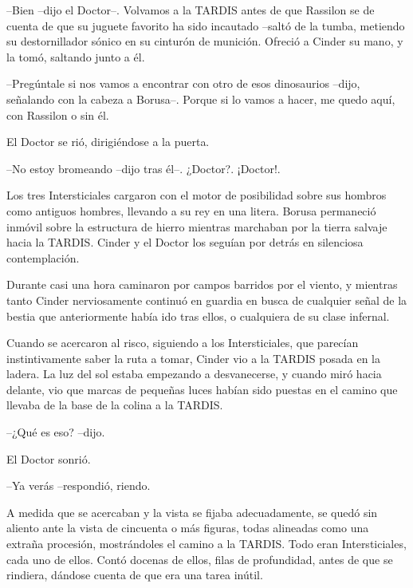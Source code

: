 --Bien --dijo el Doctor--. Volvamos a la TARDIS antes de que Rassilon se de cuenta de que su juguete favorito ha sido incautado --saltó de la tumba, metiendo su destornillador sónico en su cinturón de munición. Ofreció a Cinder su mano, y la tomó, saltando junto a él.

--Pregúntale si nos vamos a encontrar con otro de esos dinosaurios --dijo, señalando con la cabeza a Borusa--. Porque si lo vamos a hacer, me quedo aquí, con Rassilon o sin él.



El Doctor se rió, dirigiéndose a la puerta.



--No estoy bromeando --dijo tras él--. ¿Doctor?. ¡Doctor!.



Los tres Intersticiales cargaron con el motor de posibilidad sobre sus hombros como antiguos hombres, llevando a su rey en una litera. Borusa permaneció inmóvil sobre la estructura de hierro mientras marchaban por la tierra salvaje hacia la TARDIS. Cinder y el Doctor los seguían por detrás en silenciosa contemplación.

Durante casi una hora caminaron por campos barridos por el viento, y mientras tanto Cinder nerviosamente continuó en guardia en busca de cualquier señal de la bestia que anteriormente había ido tras ellos, o cualquiera de su clase infernal.

Cuando se acercaron al risco, siguiendo a los Intersticiales, que parecían instintivamente saber la ruta a tomar, Cinder vio a la TARDIS posada en la ladera. La luz del sol estaba empezando a desvanecerse, y cuando miró hacia delante, vio que marcas de pequeñas luces habían sido puestas en el camino que llevaba de la base de la colina a la TARDIS.



--¿Qué es eso? --dijo.



El Doctor sonrió. 



--Ya verás --respondió, riendo.



A medida que se acercaban y la vista se fijaba adecuadamente, se quedó sin aliento ante la vista de cincuenta o más figuras, todas alineadas como una extraña procesión, mostrándoles el camino a la TARDIS. Todo eran Intersticiales, cada uno de ellos. Contó docenas de ellos, filas de profundidad, antes de que se rindiera, dándose cuenta de que era una tarea inútil.


